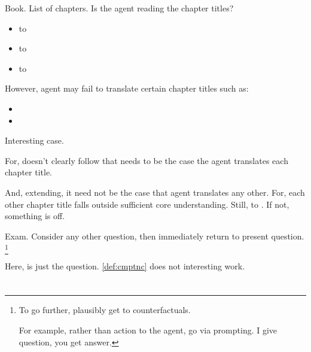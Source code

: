 \begin{note}
  \begin{illustration}[Translation]
    Book.
    List of chapters.
    Is the agent reading the chapter titles?

    \begin{itemize}
    \item
       to 
    \item
       to 
    \item
       to 
    \end{itemize}
    However, agent may fail to translate certain chapter titles such as:
    \begin{itemize}
    \item
    \item
    \end{itemize}
  \end{illustration}

  Interesting case.

  For, doesn't clearly follow that needs to be the case the agent translates each chapter title.

  And, extending, it need not be the case that agent translates any other.
  For, each other chapter title falls outside sufficient core understanding.
  Still,  to .
  If not, something is off.
\end{note}

\begin{note}
  \begin{illustration}[Focus]
    Exam.
    Consider any other question, then immediately return to present question.%
    \footnote{
      To go further, plausibly get to counterfactuals.

      For example, rather than action to the agent, go via prompting.
      I give question, you get answer.
    }
  \end{illustration}

  Here, \tRep{} is just the question.
  \autoref{def:cmptnc} does not interesting work.
\end{note}

\section{}
\label{cha:typical:sec:tC}

